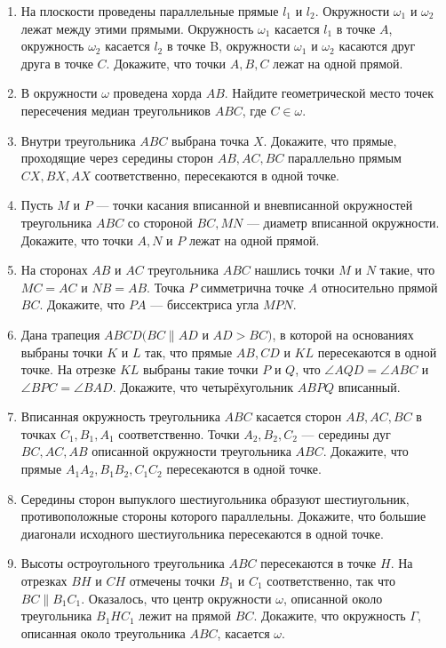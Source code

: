 \documentclass{article}
\begin{document}
\begin{enumerate}[label*=\protect\fbox{\arabic{enumi}}]
\item На плоскости проведены параллельные прямые $l_1$ и $l_2$. Окружности $\omega_1$ и $\omega_2$ лежат между этими прямыми. Окружность $\omega_1$ касается $l_1$ в точке $A$, окружность $\omega_2$ касается $l_2$ в точке B, окружности $\omega_1$ и $\omega_2$ касаются друг друга в точке $C$. Докажите, что точки $A, B, C$ лежат на одной прямой.

\item В окружности $\omega$ проведена хорда $AB$. Найдите геометрической место точек пересечения медиан треугольников $ABC$, где $C\in \omega$.

\item Внутри треугольника $ABC$ выбрана точка $X$. Докажите, что прямые, проходящие через середины сторон $AB, AC, BC$ параллельно прямым $CX, BX, AX$ соответственно, пересекаются в одной точке.

\item Пусть $M$ и $P$ — точки касания вписанной и вневписанной окружностей треугольника $ABC$ со стороной $BC, MN$ — диаметр вписанной окружности. Докажите, что точки $A, N$ и $P$ лежат на одной прямой.

\item На сторонах $AB$ и $AC$ треугольника $ABC$ нашлись точки $M$ и $N$ такие, что $MC=AC$ и $NB=AB$. Точка $P$ симметрична точке $A$ относительно прямой $BC$. Докажите, что $PA$ — биссектриса угла $MPN$.

\item Дана трапеция $ABCD (BC \parallel AD$ и $AD>BC)$, в которой на основаниях выбраны точки $K$ и $L$ так, что прямые $AB, CD$ и $KL$ пересекаются в одной точке. На отрезке $KL$ выбраны такие точки $P$ и $Q$, что $\angle AQD=\angle ABC$ и $\angle BPC=\angle BAD$. Докажите, что четырёхугольник $ABPQ$ вписанный.

\item Вписанная окружность треугольника $ABC$ касается сторон $AB, AC, BC$ в точках $C_1, B_1, A_1$ соответственно. Точки $A_2, B_2, C_2$ — середины дуг $BC, AC, AB$ описанной окружности треугольника $ABC$. Докажите, что прямые $A_1A_2, B_1B_2, C_1C_2$ пересекаются в одной точке.

\item Середины сторон выпуклого шестиугольника образуют шестиугольник, противоположные стороны которого параллельны. Докажите, что большие диагонали исходного шестиугольника пересекаются в одной точке.

\item Высоты остроугольного треугольника $ABC$ пересекаются в точке $H$. На отрезках $BH$ и $CH$ отмечены точки $B_1$ и $C_1$ соответственно, так что $BC \parallel B_1C_1$. Оказалось, что центр окружности $\omega$, описанной около треугольника $B_1HC_1$ лежит на прямой $BC$. Докажите, что окружность $\varGamma$, описанная около треугольника $ABC$, касается $\omega$.


\end{enumerate}
\end{document}
